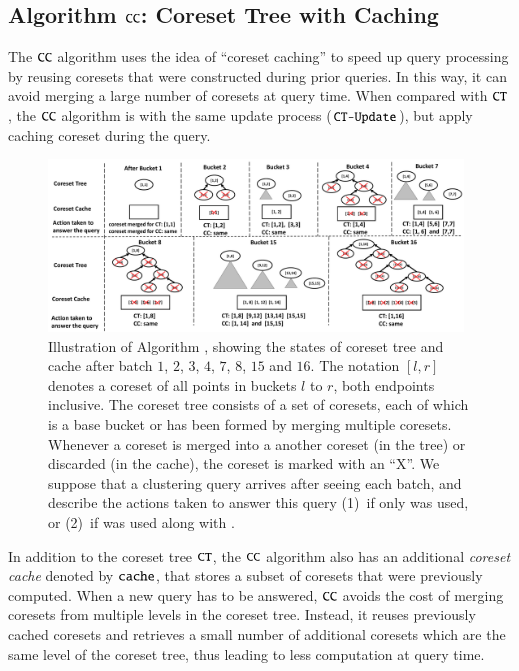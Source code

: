 \newcommand*{\keyset}{\texttt{keySet}\xspace}
\subsection{Algorithm $\texttt{CC}$: Coreset Tree with  Caching}
\label{sec:cctree}
The $\texttt{CC}$ algorithm uses the idea of ``coreset caching'' to speed up
query processing by reusing coresets that were constructed during prior
queries. In this way, it can avoid merging a large number of coresets at query
time. When compared with $\texttt{CT}$, the $\texttt{CC}$ algorithm 
is with the same update process ($\texttt{CT-Update}$), but apply caching
coreset during the query.

\begin{figure}[tb]
  \includegraphics[width=0.98\textwidth]{figs/algo-cc.pdf}
  \caption{Illustration of Algorithm \cc, showing the states of coreset tree and cache after batch $1$, $2$, $3$, $4$, $7$, $8$, $15$ and $16$. The notation $[l,r]$ denotes a coreset of all points in buckets $l$ to $r$, both endpoints inclusive. The coreset tree consists of a set of coresets, each of which is a base bucket or has been formed by merging multiple coresets. Whenever a coreset is merged into a another coreset (in the tree) or discarded (in the cache), the coreset is marked with an ``X''. We suppose that a clustering query arrives after seeing each batch, and describe the actions taken to answer this query (1)~if only \ct was used, or (2)~if \cc was used along with \ct.}
\label{fig:algo-cc}
\end{figure}

In addition to the coreset tree $\texttt{CT}$, the $\texttt{CC}$ algorithm
also has an additional \emph{coreset cache} denoted by $\texttt{cache}$, that stores a
subset of coresets that were previously computed. When a new query has
to be answered, $\texttt{CC}$ avoids the cost of merging coresets from
multiple levels in the coreset tree. Instead, it reuses previously
cached coresets and retrieves a small number of additional coresets
which are the same level of the coreset tree, thus leading to less 
computation at query time.

